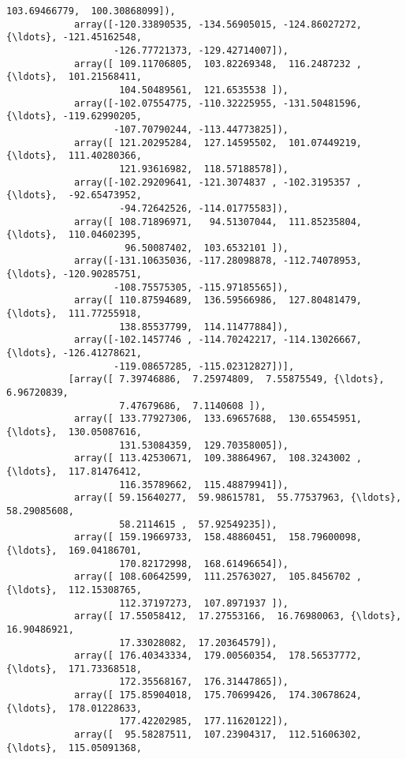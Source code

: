 \documentclass[11pt]{article}
\begin{document}
\begin{Verbatim}[commandchars=\\\{\}]
                    103.69466779,  100.30868099]),
            array([-120.33890535, -134.56905015, -124.86027272, {\ldots}, -121.45162548,
                   -126.77721373, -129.42714007]),
            array([ 109.11706805,  103.82269348,  116.2487232 , {\ldots},  101.21568411,
                    104.50489561,  121.6535538 ]),
            array([-102.07554775, -110.32225955, -131.50481596, {\ldots}, -119.62990205,
                   -107.70790244, -113.44773825]),
            array([ 121.20295284,  127.14595502,  101.07449219, {\ldots},  111.40280366,
                    121.93616982,  118.57188578]),
            array([-102.29209641, -121.3074837 , -102.3195357 , {\ldots},  -92.65473952,
                    -94.72642526, -114.01775583]),
            array([ 108.71896971,   94.51307044,  111.85235804, {\ldots},  110.04602395,
                     96.50087402,  103.6532101 ]),
            array([-131.10635036, -117.28098878, -112.74078953, {\ldots}, -120.90285751,
                   -108.75575305, -115.97185565]),
            array([ 110.87594689,  136.59566986,  127.80481479, {\ldots},  111.77255918,
                    138.85537799,  114.11477884]),
            array([-102.1457746 , -114.70242217, -114.13026667, {\ldots}, -126.41278621,
                   -119.08657285, -115.02312827])],
           [array([ 7.39746886,  7.25974809,  7.55875549, {\ldots},  6.96720839,
                    7.47679686,  7.1140608 ]),
            array([ 133.77927306,  133.69657688,  130.65545951, {\ldots},  130.05087616,
                    131.53084359,  129.70358005]),
            array([ 113.42530671,  109.38864967,  108.3243002 , {\ldots},  117.81476412,
                    116.35789662,  115.48879941]),
            array([ 59.15640277,  59.98615781,  55.77537963, {\ldots},  58.29085608,
                    58.2114615 ,  57.92549235]),
            array([ 159.19669733,  158.48860451,  158.79600098, {\ldots},  169.04186701,
                    170.82172998,  168.61496654]),
            array([ 108.60642599,  111.25763027,  105.8456702 , {\ldots},  112.15308765,
                    112.37197273,  107.8971937 ]),
            array([ 17.55058412,  17.27553166,  16.76980063, {\ldots},  16.90486921,
                    17.33028082,  17.20364579]),
            array([ 176.40343334,  179.00560354,  178.56537772, {\ldots},  171.73368518,
                    172.35568167,  176.31447865]),
            array([ 175.85904018,  175.70699426,  174.30678624, {\ldots},  178.01228633,
                    177.42202985,  177.11620122]),
            array([  95.58287511,  107.23904317,  112.51606302, {\ldots},  115.05091368,

\end{Verbatim}
\end{document}
